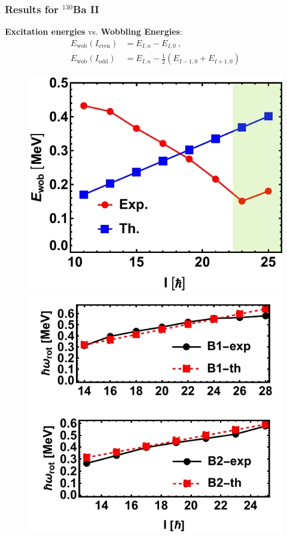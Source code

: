 \documentclass{beamer}
\begin{document}
\begin{frame}
	\frametitle{Results for $^{130}$Ba II}
	\textbf{Excitation energies} vs. \textbf{Wobbling Energies}:
	\begin{align}
		E_\text{wob}(I_\text{even})&=E_{I,n}-E_{I,0}\ ,\nonumber \\
		E_\text{wob}(I_\text{odd})&=E_{I,n}-\frac{1}{2}\left(E_{I-1,0}+E_{I+1,0}\right) \nonumber
	\end{align}
	\vspace{-0.6cm}
	\begin{figure}
		\centering
		\includegraphics[scale=0.6]{figures/ba130-wobbling-energies-edited.pdf}
		\includegraphics[scale=0.55]{figures/ba130-rotational-frequencies.pdf}

\end{figure}
\end{frame}
\end{document}
